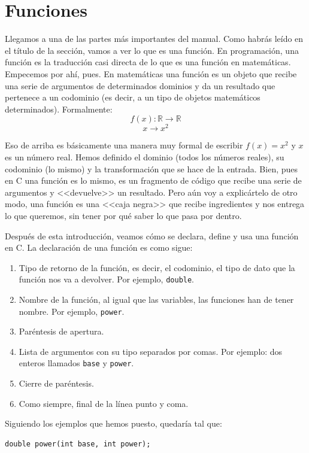 \documentclass[a4paper]{article}
\begin{document}
\section{Funciones}
\label{funciones}
Llegamos a una de las partes más importantes del manual. Como habrás leído en el
título de la sección, vamos a ver lo que es una función. En programación, una
función es la traducción casi directa de lo que es una función en matemáticas.
Empecemos por ahí, pues. En matemáticas una función es un objeto que recibe una
serie de argumentos de determinados dominios y da un resultado que pertenece
a un codominio (es decir, a un tipo de objetos matemáticos determinados).
Formalmente:
$$
f(x) : \mathbb{R} \longrightarrow \mathbb{R}
$$
$$
x \to x^2
$$

Eso de arriba es básicamente una manera muy formal de escribir $f(x) = x^2$ y
$x$ es un número real. Hemos definido el dominio (todos los números reales),
su codominio (lo mismo) y la transformación que se hace de la entrada. Bien, pues
en C una función es lo mismo, es un fragmento de código que recibe una serie
de argumentos y <<devuelve>> un resultado. Pero aún voy a explicártelo de otro
modo, una función es una <<caja negra>> que recibe ingredientes y nos entrega
lo que queremos, sin tener por qué saber lo que pasa por dentro.

Después de esta introducción, veamos cómo se declara, define y usa una función
en C. La declaración de una función es como sigue:
\begin{enumerate}
\item Tipo de retorno de la función, es decir, el codominio, el tipo de dato
que la función nos va a devolver. Por ejemplo, \lstinline[style=C]{double}.
\item Nombre de la función, al igual que las variables, las funciones han de
tener nombre. Por ejemplo, \verb!power!.
\item Paréntesis de apertura.
\item Lista de argumentos con su tipo separados por comas. Por ejemplo: dos
enteros llamados \verb!base! y \verb!power!.
\item Cierre de paréntesis.
\item Como siempre, final de la línea punto y coma.
\end{enumerate}

Siguiendo los ejemplos que hemos puesto, quedaría tal que:


\noindent
\begin{minipage}[H]{\linewidth}
\mbox{}
\begin{lstlisting}[style=C, label={lst:functionDeclaration},
caption={Declaración de una función en C}]
double power(int base, int power);
\end{lstlisting}
\end{minipage}
\end{document}

